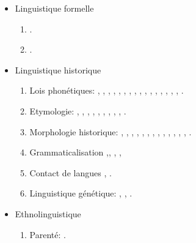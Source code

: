 \documentclass[oldfontcommands,oneside,a4paper,11pt]{article}
\newcommand{\langue}[2]{#2}
\begin{document}
\begin{itemize}
\item \langue{Formal linguistics}{Linguistique formelle}
\begin{enumerate}
\item \citet{walther14inv.canon}.
\item \citet{walther14compactness}.
\end{enumerate}

\item \langue{Historical linguistics}{Linguistique historique}
\begin{enumerate}
\item \langue{Sound laws}{Lois phonétiques}:  \citet{jacques00ywij}, \citet{jacques01dg}, \citet{jacques03dissimilation},   \citet{jacques04thimphu}, \citet{jacques06comparaison}, \citet{jacques09wazur}, \citet{jacques09e}, \citet{michaud10bonin}, \citet{jacques10ndr}, \citet{jacques.michaud11naish},   \citet{rg-gj12yod}, \citet{jacques13arapaho}, \citet{jacques13yod}, \citet{jacques14snom},   \citet{jacques14esquisse}, \citet{jacques14cone}, \citet{jacques16ebde}.
\item  \langue{Etymology}{Etymologie}:    \citet{jacques07naksatram}, \citet{jacques08debther}, \citet{jacques09zz}, \citet{jacques10imperial}, \citet{jacques11ngwemi}, \citet{jacques12bear},  \citet{jacques13vama},   \citet{jacques14esquisse}, \citet{jacques15sr}, \citet{jacques15cochon}.
\item \langue{Historical morphology}{Morphologie historique}:  \citet{jacques03s.houzhui}, \citet{jacques06morpho}, \citet{jacques07chang},    \citet{jacques09tangutverb}, \citet{jacques10zos}, \citet{jacques11tangut.verb}, \citet{jacques12agreement}, \citet{jacques12internal}, \citet{jacques14antipassive},   \citet{jacques14esquisse}, \citet{jacques14cone}, \citet{jacques15derivational.khaling}, \citet{jacques15causative}, \citet{jacques16ebde}.
\item \langue{Grammaticalization:}{Grammaticalisation} \citet{jacques12internal},\citet{jacques13harmonization}, \citet{jacques14antipassive}, \citet{jacques14ergative}, \citet{jacques15comparative}
\item \langue{Language contact:}{Contact de langues} \citet{antonov12kumush},   \citet{jacques12bear}.
\item \langue{Genetic linguistics}{Linguistique génétique}:  \citet{jacques07chang}, \citet{jacques12agreement}, \citet{jacques2015genetic}.
\end{enumerate}
\item \langue{Ethnolinguistics}{Ethnolinguistique}
\begin{enumerate}
\item \langue{Kinship}{Parenté}: \citet{jacques11kinship}. 

\end{enumerate}
  
  
\end{itemize}




\end{document}
